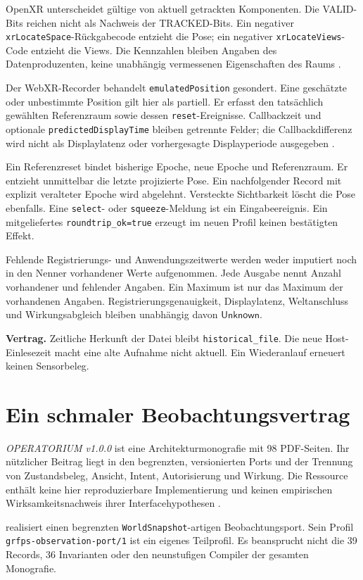 \documentclass[11pt,a4paper]{article}
\newcommand{\Unknown}{\ensuremath{\mathsf{Unknown}}}
\newcommand{\contract}[1]{\vspace{3pt}\noindent\colorbox{pale}{\parbox{\dimexpr\linewidth-2\fboxsep}{\textbf{Vertrag.} #1}}\vspace{5pt}}
\newcommand{\nextsection}[2]{\clearpage{\color{accent}\small\textsf{#1}}\section{#2}}
\begin{document}
OpenXR unterscheidet gültige von aktuell getrackten Komponenten.
Die VALID-Bits reichen nicht als Nachweis der TRACKED-Bits.
Ein negativer \texttt{xrLocateSpace}-Rückgabecode entzieht die Pose;
ein negativer \texttt{xrLocateViews}-Code entzieht die Views.
Die Kennzahlen bleiben Angaben des Datenproduzenten, keine
unabhängig vermessenen Eigenschaften des Raums \cite{openxrflags}.

Der WebXR-Recorder behandelt \texttt{emulatedPosition} gesondert.
Eine geschätzte oder unbestimmte Position gilt hier als partiell.
Er erfasst den tatsächlich gewählten Referenzraum sowie dessen
\texttt{reset}-Ereignisse. Callbackzeit und optionale
\texttt{predictedDisplayTime} bleiben getrennte Felder;
die Callbackdifferenz wird nicht als Displaylatenz oder
vorhergesagte Displayperiode ausgegeben \cite{webxr}.

Ein Referenzreset bindet bisherige Epoche, neue Epoche und
Referenzraum. Er entzieht unmittelbar die letzte projizierte Pose.
Ein nachfolgender Record mit explizit veralteter Epoche wird
abgelehnt. Versteckte Sichtbarkeit löscht die Pose ebenfalls.
Eine \texttt{select}- oder \texttt{squeeze}-Meldung ist ein
Eingabeereignis. Ein mitgeliefertes \texttt{roundtrip\_ok=true}
erzeugt im neuen Profil keinen bestätigten Effekt.

Fehlende Registrierungs- und Anwendungszeitwerte werden weder
imputiert noch in den Nenner vorhandener Werte aufgenommen.
Jede Ausgabe nennt Anzahl vorhandener und fehlender Angaben.
Ein Maximum ist nur das Maximum der vorhandenen Angaben.
Registrierungsgenauigkeit, Displaylatenz, Weltanschluss und
Wirkungsabgleich bleiben unabhängig davon \Unknown.

\contract{Zeitliche Herkunft der Datei bleibt
\texttt{historical\_file}. Die neue Host-Einlesezeit macht eine
alte Aufnahme nicht aktuell. Ein Wiederanlauf erneuert keinen
Sensorbeleg.}

\nextsection{86 / OPERATORIUM-ANSCHLUSS}{Ein schmaler Beobachtungsvertrag}
\emph{OPERATORIUM v1.0.0} ist eine Architekturmonografie mit
98 PDF-Seiten. Ihr nützlicher Beitrag liegt in den begrenzten,
versionierten Ports und der Trennung von Zustandsbeleg, Ansicht,
Intent, Autorisierung und Wirkung. Die Ressource enthält keine
hier reproduzierbare Implementierung und keinen empirischen
Wirksamkeitsnachweis ihrer Interfacehypothesen \cite{operatorium}.

 realisiert einen begrenzten
\texttt{WorldSnapshot}-artigen Beobachtungsport. Sein Profil
\texttt{grfps-observation-port/1} ist ein eigenes Teilprofil.
Es beansprucht nicht die 39 Records, 36 Invarianten oder den
neunstufigen Compiler der gesamten Monografie.
\end{document}
